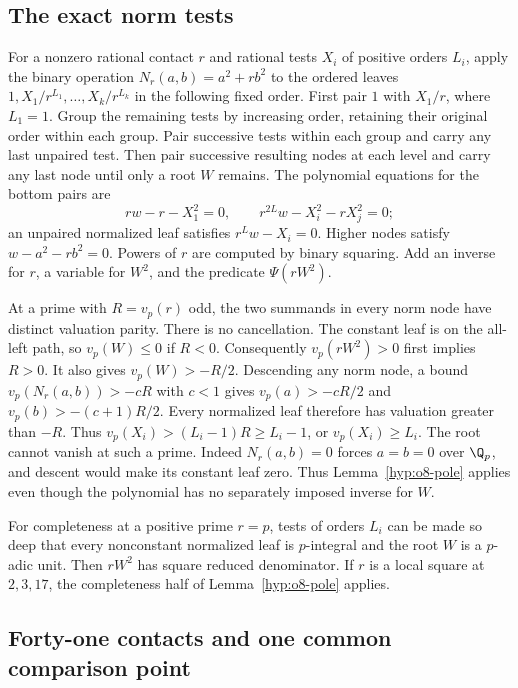 \subsection{The exact norm tests}

For a nonzero rational contact $r$ and rational tests $X_i$ of positive
orders $L_i$, apply the binary operation
$N_r(a,b)=a^2+rb^2$ to the ordered leaves
$1,X_1/r^{L_1},\ldots,X_k/r^{L_k}$ in the following fixed order.
First pair $1$ with $X_1/r$, where $L_1=1$. Group the remaining
tests by increasing order, retaining their original order within each
group. Pair successive tests within each group and carry any last
unpaired test. Then pair successive resulting nodes at each level and
carry any last node until only a root $W$ remains. The polynomial
equations for the bottom pairs are
\[
 rw-r-X_1^2=0,\qquad
 r^{2L}w-X_i^2-rX_j^2=0;
\]
an unpaired normalized leaf satisfies $r^Lw-X_i=0$.
Higher nodes satisfy $w-a^2-rb^2=0$. Powers of $r$ are computed
by binary squaring. Add an inverse for $r$, a variable for $W^2$,
and the predicate $\Psi(rW^2)$.

At a prime with $R=v_p(r)$ odd, the two summands in every norm node
have distinct valuation parity. There is no cancellation. The constant
leaf is on the all-left path, so $v_p(W)\le0$ if $R<0$.
Consequently $v_p(rW^2)>0$ first implies $R>0$.
It also gives $v_p(W)>-R/2$. Descending any norm node, a bound
$v_p(N_r(a,b))>-cR$ with $c<1$ gives
$v_p(a)>-cR/2$ and $v_p(b)>-(c+1)R/2$.
Every normalized leaf therefore has valuation greater than $-R$.
Thus $v_p(X_i)>(L_i-1)R\ge L_i-1$, or $v_p(X_i)\ge L_i$.
The root cannot vanish at such a prime. Indeed $N_r(a,b)=0$ forces
$a=b=0$ over $\Q_p$, and descent would make its constant leaf zero.
Thus Lemma~\ref{hyp:o8-pole} applies even though the polynomial
has no separately imposed inverse for $W$.

For completeness at a positive prime $r=p$, tests of orders $L_i$
can be made so deep that every nonconstant normalized leaf is
$p$-integral and the root $W$ is a $p$-adic unit. Then $rW^2$ has
square reduced denominator. If $r$ is a local square at $2,3,17$,
the completeness half of Lemma~\ref{hyp:o8-pole} applies.

\subsection{Forty-one contacts and one common comparison point}

